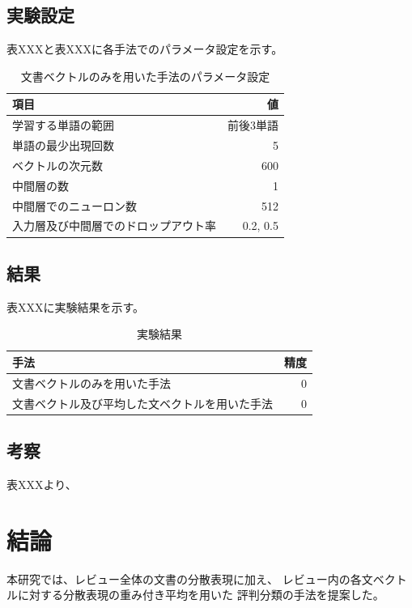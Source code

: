 \documentclass{ttithesis}
\begin{document}
\subsection{実験設定}

表XXXと表XXXに各手法でのパラメータ設定を示す。

\begin{table}
  \caption{文書ベクトルのみを用いた手法のパラメータ設定}
  \begin{tabular}{l | r}
    項目 & 値 \\
    \hline
    学習する単語の範囲 & 前後3単語 \\
    単語の最少出現回数 & 5 \\
    ベクトルの次元数 & 600 \\
    中間層の数 & 1 \\
    中間層でのニューロン数 & 512 \\
    入力層及び中間層でのドロップアウト率 & 0.2, 0.5 \\
  \end{tabular}
\end{table}


\subsection{結果}

表XXXに実験結果を示す。

\begin{table}
  \caption{実験結果}
  \begin{tabular}{l | r}
    手法 & 精度 \\
    \hline
    文書ベクトルのみを用いた手法 & 0 \\
    文書ベクトル及び平均した文ベクトルを用いた手法 & 0 \\
  \end{tabular}
\end{table}

\subsection{考察}

表XXXより、



\section{結論}

本研究では、レビュー全体の文書の分散表現に加え、
レビュー内の各文ベクトルに対する分散表現の重み付き平均を用いた
評判分類の手法を提案した。
\end{document}
